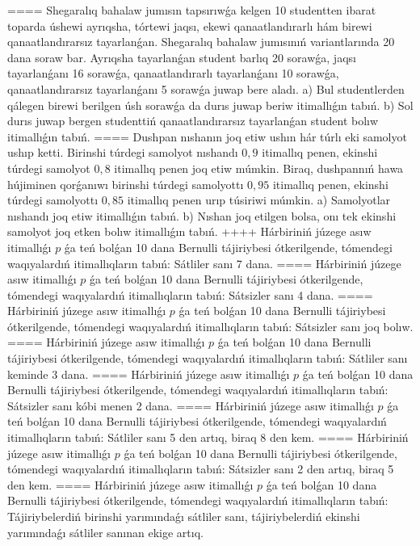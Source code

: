 ====
Shegaralıq bahalaw jumısın tapsırıwǵa kelgen 10 studentten ibarat toparda úshewi ayrıqsha, tórtewi jaqsı, ekewi qanaatlandırarlı hám birewi qanaatlandırarsız tayarlanǵan. Shegaralıq bahalaw jumısınıń variantlarında 20 dana soraw bar. Ayrıqsha tayarlanǵan student barlıq 20 sorawǵa, jaqsı tayarlanǵanı 16 sorawǵa, qanaatlandırarlı tayarlanǵanı 10 sorawǵa, qanaatlandırarsız tayarlanǵanı 5 sorawǵa juwap bere aladı. a) Bul studentlerden qálegen birewi berilgen úsh sorawǵa da durıs juwap beriw itimallıǵın tabıń. b) Sol durıs juwap bergen studenttiń qanaatlandırarsız tayarlanǵan student bolıw itimallıǵın tabıń.
====
Dushpan nıshanın joq etiw ushın hár túrlı eki samolyot ushıp ketti. Birinshi túrdegi samolyot nıshandı $0,9$ itimallıq penen, ekinshi túrdegi samolyot $0,8$ itimallıq penen joq etiw múmkin. Biraq, dushpannıń hawa hújiminen qorǵanıwı birinshi túrdegi samolyottı $0,95$ itimallıq penen, ekinshi túrdegi samolyottı $0,85$ itimallıq penen urıp túsiriwi múmkin. a) Samolyotlar nıshandı joq etiw itimallıǵın tabıń. b) Nıshan joq etilgen bolsa, onı tek ekinshi samolyot joq etken bolıw itimallıǵın tabıń.
++++
Hárbiriniń júzege asıw itimallıǵı $p$ ǵa teń bolǵan 10 dana Bernulli tájiriybesi ótkerilgende, tómendegi waqıyalardıń itimallıqların tabıń: Sátliler sanı 7 dana.
====
Hárbiriniń júzege asıw itimallıǵı $p$ ǵa teń bolǵan 10 dana Bernulli tájiriybesi ótkerilgende, tómendegi waqıyalardıń itimallıqların tabıń: Sátsizler sanı 4 dana.
====
Hárbiriniń júzege asıw itimallıǵı $p$ ǵa teń bolǵan 10 dana Bernulli tájiriybesi ótkerilgende, tómendegi waqıyalardıń itimallıqların tabıń: Sátsizler sanı joq bolıw.
====
Hárbiriniń júzege asıw itimallıǵı $p$ ǵa teń bolǵan 10 dana Bernulli tájiriybesi ótkerilgende, tómendegi waqıyalardıń itimallıqların tabıń: Sátliler sanı keminde 3 dana.
====
Hárbiriniń júzege asıw itimallıǵı $p$ ǵa teń bolǵan 10 dana Bernulli tájiriybesi ótkerilgende, tómendegi waqıyalardıń itimallıqların tabıń: Sátsizler sanı kóbi menen 2 dana.
====
Hárbiriniń júzege asıw itimallıǵı $p$ ǵa teń bolǵan 10 dana Bernulli tájiriybesi ótkerilgende, tómendegi waqıyalardıń itimallıqların tabıń: Sátliler sanı 5 den artıq, biraq 8 den kem.
====
Hárbiriniń júzege asıw itimallıǵı $p$ ǵa teń bolǵan 10 dana Bernulli tájiriybesi ótkerilgende, tómendegi waqıyalardıń itimallıqların tabıń: Sátsizler sanı 2 den artıq, biraq 5 den kem.
====
Hárbiriniń júzege asıw itimallıǵı $p$ ǵa teń bolǵan 10 dana Bernulli tájiriybesi ótkerilgende, tómendegi waqıyalardıń itimallıqların tabıń: Tájiriybelerdiń birinshi yarımındaǵı sátliler sanı, tájiriybelerdiń ekinshi yarımındaǵı sátliler sanınan ekige artıq.
